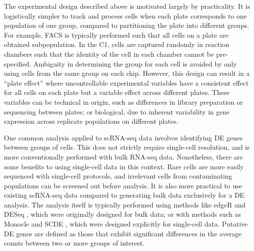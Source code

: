 \documentclass[oupdraft]{bio}
\begin{document}
The experimental design described above is motivated largely by practicality.
It is logistically simpler to track and process cells when each plate corresponds to one population of one group, compared to partitioning the plate into different groups.
For example, FACS is typically performed such that all cells on a plate are obtained  subpopulation.
In the C1, cells are captured randomly in reaction chambers such that the identity of the cell in each chamber cannot be pre-specified.
Ambiguity in determining the group for each cell is avoided by only using cells from the same group on each chip.
However, this design can result in a ``plate effect'' where uncontrollable experimental variables have a consistent effect  for all cells on each plate but a variable effect across different plates. 
These variables can be technical in origin, such as differences in library preparation or sequencing between plates; 
    or biological, due to inherent variability in gene expression across replicate populations on different plates.


One common analysis applied to scRNA-seq data involves identifying DE genes between groups of cells.
This does not strictly require single-cell resolution, and is more conventionally performed with bulk RNA-seq data.
Nonetheless, there are some benefits to using single-cell data in this context.
Rare cells are more easily sequenced with single-cell protocols, and irrelevant cells from contaminating populations can be screened out before analysis.
It is also more practical to use existing scRNA-seq data compared to generating bulk data exclusively for a DE analysis.
The analysis itself is typically performed using methods like edgeR \citep{robinson2010edgeR} and DESeq \citep{anders2010differential}, which were originally designed for bulk data;
    or with methods such as Monocle \citep{trapnell2014dynamics} and SCDE \citep{kharchenko2014bayesian}, which were designed explicitly for single-cell data.
Putative DE genes are defined as those that exhibit significant differences in the average counts between two or more groups of interest.
\end{document}
